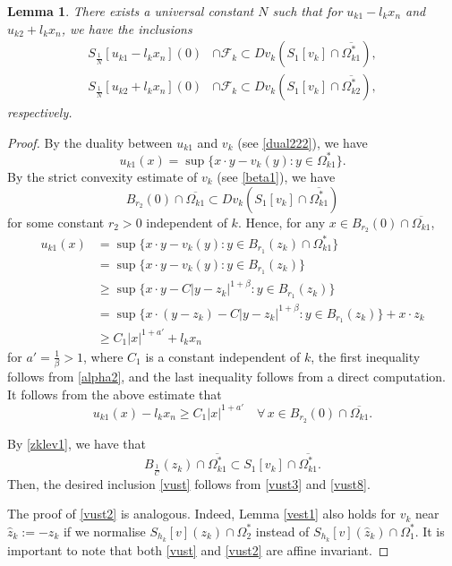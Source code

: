\documentclass[11pt]{amsart}
\theoremstyle{plain}
\newtheorem{lemma}{Lemma}[section]
\newcommand{\0}{\textbf{0}}
\numberwithin{equation}{section}
\numberwithin{equation}{section}
\numberwithin{figure}{section}
\begin{document}
\begin{lemma}\label{alpha1}
  There exists a universal constant \(N\) such that for \(u_{k1}-l_kx_n\) and \(u_{k2}+l_kx_n\), we have the inclusions
  \begin{align}
    S_{\frac{1}{N}}[u_{k1}-l_kx_n](0) &\cap \mathcal{F}_k \subset Dv_k(S_1[v_k] \cap \overline{\Omega^*_{k1}}), \label{vust} \\
    S_{\frac{1}{N}}[u_{k2}+l_kx_n](0) &\cap \mathcal{F}_k \subset Dv_k(S_1[v_k] \cap \overline{\Omega^*_{k2}}), \label{vust2}
  \end{align}
  respectively.
\end{lemma}
\begin{proof}
By the duality between \(u_{k1}\) and \(v_k\) (see \eqref{dual222}), we have
\[ u_{k1}(x) = \sup\{x\cdot y - v_{k}(y) : y \in \Omega^*_{k1}\}. \]
By the strict convexity estimate of \( v_k \) (see \eqref{beta1}), we have 
\begin{equation}\label{vust8}
B_{r_2}(0) \cap \overline{\Omega_{k1}} \subset Dv_k\left(S_1[v_k] \cap \overline{\Omega^*_{k1}}\right)
\end{equation}
for some constant \( r_2 > 0 \) independent of \( k \).  
Hence, for any \( x \in B_{r_2}(0) \cap \overline{\Omega_{k1}} \),
\begin{align*}
u_{k1}(x) &= \sup\{x\cdot y - v_k(y) : y \in B_{r_1}(z_k) \cap \Omega_{k1}^*\} \\
&= \sup\{x\cdot y - v_k(y) : y \in B_{r_1}(z_k)\} \\
&\geq \sup\{x\cdot y - C|y - z_k|^{1+\beta} : y \in B_{r_1}(z_k)\} \\
&= \sup\{x\cdot (y - z_k) - C|y - z_k|^{1+\beta} : y \in B_{r_1}(z_k)\} + x\cdot z_k \\
  &\geq  C_1|x|^{1+a'}+l_kx_n
\end{align*}
for  \( a'=\frac{1}{\beta} > 1 \),
where \( C_1 \) is a constant independent of \( k \),  the first inequality follows from \eqref{alpha2}, and the last inequality
follows from a direct computation. It follows from the above estimate that
\begin{equation}\label{vust3}
u_{k1}(x) - l_k x_n \geq C_1 |x|^{1 + a'}\quad\forall\, x\in B_{r_2}(0) \cap \overline{\Omega_{k1}}.
\end{equation} 

By \eqref{zklev1}, we have that 
\[ B_{\frac{1}{C}}(z_k) \cap \overline{\Omega^*_{k1}} \subset S_1[v_k] \cap \overline{\Omega^*_{k1}}. \]
Then, the desired inclusion \eqref{vust} follows from \eqref{vust3} and \eqref{vust8}.

The proof of \eqref{vust2} is analogous. Indeed, Lemma \ref{vest1} also holds for \( v_{k} \) near \( \hat{z}_k := -z_k \) if we normalise \( S_{h_k}[v](z_k) \cap \Omega^*_2 \) instead of \( S_{h_k}[v](\hat z_k) \cap \Omega^*_1 \). It is important to note that both \eqref{vust} and \eqref{vust2} are affine invariant.
\end{proof}
\end{document}
